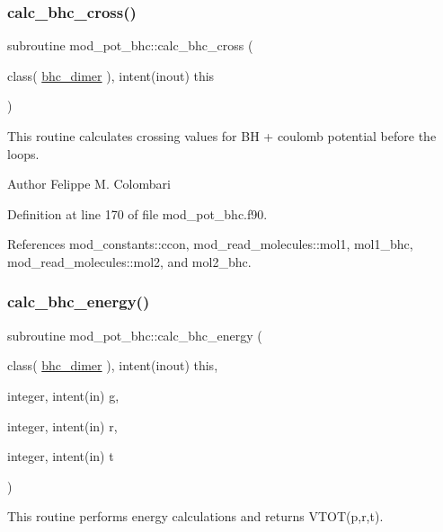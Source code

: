 \subsubsection{\texorpdfstring{calc\+\_\+bhc\+\_\+cross()}{calc\_bhc\_cross()}}
{\footnotesize\ttfamily subroutine mod\+\_\+pot\+\_\+bhc\+::calc\+\_\+bhc\+\_\+cross (\begin{DoxyParamCaption}\item[{class( \hyperlink{structmod__pot__bhc_1_1bhc__dimer}{bhc\+\_\+dimer} ), intent(inout)}]{this }\end{DoxyParamCaption})}



This routine calculates crossing values for BH + coulomb potential before the loops. 

\begin{DoxyAuthor}{Author}
Felippe M. Colombari 
\end{DoxyAuthor}


Definition at line 170 of file mod\+\_\+pot\+\_\+bhc.\+f90.



References mod\+\_\+constants\+::ccon, mod\+\_\+read\+\_\+molecules\+::mol1, mol1\+\_\+bhc, mod\+\_\+read\+\_\+molecules\+::mol2, and mol2\+\_\+bhc.

\mbox{\label{namespacemod__pot__bhc_a4053339b84bceb793c404010f7735624}} 
\subsubsection{\texorpdfstring{calc\+\_\+bhc\+\_\+energy()}{calc\_bhc\_energy()}}
{\footnotesize\ttfamily subroutine mod\+\_\+pot\+\_\+bhc\+::calc\+\_\+bhc\+\_\+energy (\begin{DoxyParamCaption}\item[{class( \hyperlink{structmod__pot__bhc_1_1bhc__dimer}{bhc\+\_\+dimer} ), intent(inout)}]{this,  }\item[{integer, intent(in)}]{g,  }\item[{integer, intent(in)}]{r,  }\item[{integer, intent(in)}]{t }\end{DoxyParamCaption})}



This routine performs energy calculations and returns V\+T\+O\+T(p,r,t). 

